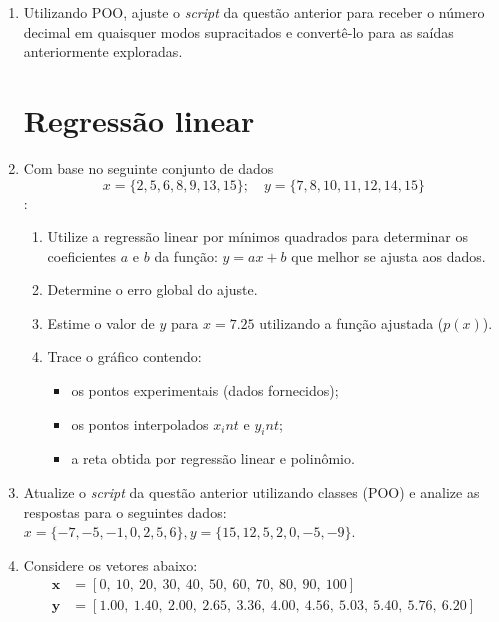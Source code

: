 \documentclass[12pt]{elsarticle}
\begin{document}
\begin{enumerate}
\item Utilizando POO, ajuste o {\it script} da questão anterior para receber o número decimal em quaisquer modos supracitados e convertê-lo para as saídas 
anteriormente exploradas.

\section*{Regressão linear}


\item Com base no seguinte conjunto de dados \[x = \{2,5,6,8,9,13,15\};\quad y = \{7,8,10,11,12,14,15\}\]:
\begin{enumerate}
    \item Utilize a regressão linear por mínimos quadrados para determinar os coeficientes $a$ e $b$ da função:
    \( y = ax + b\) que melhor se ajusta aos dados.

    \item Determine o erro global do ajuste.

    \item Estime o valor de $y$ para $x = 7.25$ utilizando a função ajustada ($p(x)$).

    \item Trace o gráfico contendo:
    \begin{itemize}
        \item os pontos experimentais (dados fornecidos);
        \item os pontos interpolados $x_int$ e $y_int$;
        \item a reta obtida por regressão linear e polinômio.
    \end{itemize}
\end{enumerate}

	\item Atualize o {\it script} da questão anterior utilizando classes (POO) e analize as respostas 
	para o seguintes dados: \(x = \{-7, -5, -1, 0, 2, 5, 6\}, y = \{15, 12, 5, 2, 0, -5, -9\}\).

\item Considere os vetores abaixo:	
	\begin{align*}
		\mathbf{x}  &= [0,\ 10,\ 20,\ 30,\ 40,\ 50,\ 60,\ 70,\ 80,\ 90,\ 100] \\
		\mathbf{y} &= [1.00,\ 1.40,\ 2.00,\ 2.65,\ 3.36,\ 4.00,\ 4.56,\ 5.03,\ 5.40,\ 5.76,\ 6.20]
	\end{align*}
	

\end{enumerate}
\end{document}
